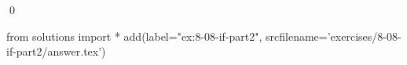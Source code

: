 
\begin{ex}
  \label{ex:8-08-if-part2}
  
  \qed
\end{ex}
\begin{python0}
from solutions import *
add(label="ex:8-08-if-part2",
    srcfilename='exercises/8-08-if-part2/answer.tex')
\end{python0}
